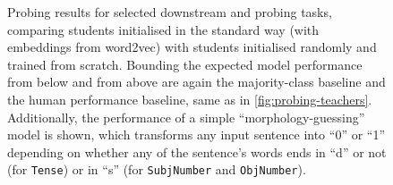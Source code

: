 \documentclass[bsc,frontabs,singlespacing,parskip,deptreport]{infthesis}
\begin{document}
{{    \begin{figure}[h!tb]
      \centering
      \cprotect\caption{Probing results for selected downstream and probing tasks, comparing students initialised in the standard way (with embeddings from word2vec) with students initialised randomly and trained from scratch. Bounding the expected model performance from below and from above are again the majority-class baseline and the human performance baseline, same as in \autoref{fig:probing-teachers}.
      Additionally, the performance of a simple ``morphology-guessing'' model is shown, which transforms any input sentence into ``0'' or ``1'' depending on whether any of the sentence's words ends in ``d'' or not (for \verb|Tense|) or in ``s'' (for \verb|SubjNumber| and \verb|ObjNumber|).}
      \label{fig:probing-students-scratch-selected}
    \end{figure}

}}
\end{document}
